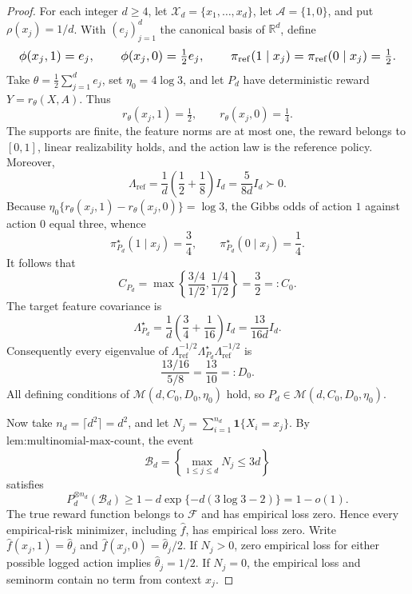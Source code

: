 \documentclass{article}
\begin{document}
\begin{proof}
For each integer \(d\ge4\), let \(\mathcal X_d=\{x_1,\ldots,x_d\}\), let \(\mathcal A=\{1,0\}\), and put \(\rho(x_j)=1/d\). With \((e_j)_{j=1}^d\) the canonical basis of \(\mathbb R^d\), define
\[
\makebox[\linewidth][c]{\resizebox{0.98\linewidth}{!}{\(\displaystyle \phi(x_j,1)=e_j,\qquad \phi(x_j,0)=\tfrac12e_j,
\qquad \pi_{\mathrm{ref}}(1\mid x_j)=\pi_{\mathrm{ref}}(0\mid x_j)=\tfrac12.\)}}
\]
Take \(\theta=\tfrac12\sum_{j=1}^d e_j\), set \(\eta_0=4\log3\), and let \(P_d\) have deterministic reward \(Y=r_\theta(X,A)\). Thus
\[
r_\theta(x_j,1)=\tfrac12,\qquad r_\theta(x_j,0)=\tfrac14.
\]
The supports are finite, the feature norms are at most one, the reward belongs to \([0,1]\), linear realizability holds, and the action law is the reference policy. Moreover,
\[
\Lambda_{\mathrm{ref}}=\frac1d\left(\frac12+\frac18\right)I_d=\frac{5}{8d}I_d\succ0.
\]
Because \(\eta_0\{r_\theta(x_j,1)-r_\theta(x_j,0)\}=\log3\), the Gibbs odds of action \(1\) against action \(0\) equal three, whence
\[
\pi_{P_d}^\star(1\mid x_j)=\frac34,
\qquad
\pi_{P_d}^\star(0\mid x_j)=\frac14.
\]
It follows that
\[
C_{P_d}=\max\left\{\frac{3/4}{1/2},\frac{1/4}{1/2}\right\}=\frac32=:C_0.
\]
The target feature covariance is
\[
\Lambda_{P_d}^\star=\frac1d\left(\frac34+\frac1{16}\right)I_d=\frac{13}{16d}I_d.
\]
Consequently every eigenvalue of \(\Lambda_{\mathrm{ref}}^{-1/2}\Lambda_{P_d}^\star\Lambda_{\mathrm{ref}}^{-1/2}\) is
\[
\frac{13/16}{5/8}=\frac{13}{10}=:D_0.
\]
All defining conditions of \(\mathcal M(d,C_0,D_0,\eta_0)\) hold, so \(P_d\in\mathcal M(d,C_0,D_0,\eta_0)\).

Now take \(n_d=\lceil d^2\rceil=d^2\), and let \(N_j=\sum_{i=1}^{n_d}\mathbf 1\{X_i=x_j\}\). By \(\text{lem:multinomial-max-count}\), the event
\[
\mathcal B_d=\left\{\max_{1\le j\le d}N_j\le3d\right\}
\]
satisfies
\[
P_d^{\otimes n_d}(\mathcal B_d)\ge1-d\exp\{-d(3\log3-2)\}=1-o(1).
\]
The true reward function belongs to \(\mathcal F\) and has empirical loss zero. Hence every empirical-risk minimizer, including \(\widehat f\), has empirical loss zero. Write \(\widehat f(x_j,1)=\widehat\theta_j\) and \(\widehat f(x_j,0)=\widehat\theta_j/2\). If \(N_j>0\), zero empirical loss for either possible logged action implies \(\widehat\theta_j=1/2\). If \(N_j=0\), the empirical loss and seminorm contain no term from context \(x_j\).


\end{proof}
\end{document}

